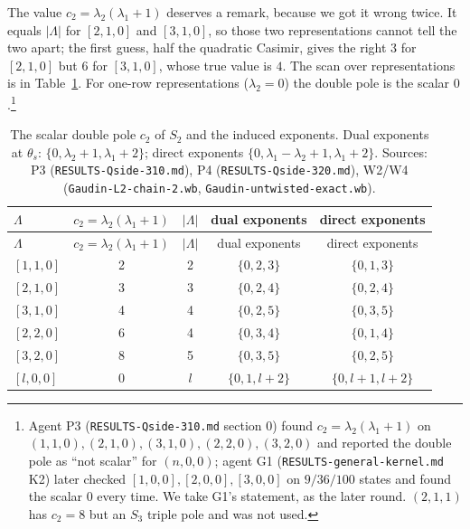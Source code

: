 \documentclass[11pt]{article}
\begin{document}
The value $c_2=\lambda_2(\lambda_1+1)$ deserves a remark, because we got it wrong twice.
It equals $|\Lambda|$ for $[2,1,0]$ and $[3,1,0]$, so those two representations cannot tell the two apart; the first guess, half the quadratic Casimir, gives the right $3$ for $[2,1,0]$ but $6$ for $[3,1,0]$, whose true value is $4$. The scan over representations is in Table~\ref{tab:c2}.
For one-row representations ($\lambda_2=0$) the double pole is the scalar $0$.\footnote{Agent P3 (\texttt{RESULTS-\allowbreak{}Qside-\allowbreak{}310.\allowbreak{}md} section 0) found $c_2=\lambda_2(\lambda_1+1)$ on $(1,1,0),(2,1,0),(3,1,0),(2,2,0),(3,2,0)$ and reported the double pole as ``not scalar'' for $(n,0,0)$; agent G1 (\texttt{RESULTS-\allowbreak{}general-\allowbreak{}kernel.\allowbreak{}md} K2) later checked $[1,0,0],[2,0,0],[3,0,0]$ on $9/36/100$ states and found the scalar $0$ every time.
We take G1's statement, as the later round. $(2,1,1)$ has $c_2=8$ but an $S_3$ triple pole and was not used.}

{\small
\begin{longtable}{lcccc}
\caption{The scalar double pole $c_2$ of $S_2$ and the induced exponents.
Dual exponents at $\theta_s$: $\{0,\lambda_2+1,\lambda_1+2\}$; direct exponents $\{0,\lambda_1-\lambda_2+1,\lambda_1+2\}$. Sources: P3 (\texttt{RESULTS-\allowbreak{}Qside-\allowbreak{}310.\allowbreak{}md}), P4 (\texttt{RESULTS-\allowbreak{}Qside-\allowbreak{}320.\allowbreak{}md}), W2/W4 (\texttt{Gaudin-\allowbreak{}L2-\allowbreak{}chain-\allowbreak{}2.\allowbreak{}wb}, \texttt{Gaudin-\allowbreak{}untwisted-\allowbreak{}exact.\allowbreak{}wb}).}\label{tab:c2}\\
\toprule
$\Lambda$ & $c_2=\lambda_2(\lambda_1+1)$ & $|\Lambda|$ & dual exponents & direct exponents \\
\midrule
\endfirsthead
\toprule
$\Lambda$ & $c_2=\lambda_2(\lambda_1+1)$ & $|\Lambda|$ & dual exponents & direct exponents \\
\midrule
\endhead
\bottomrule
\endlastfoot
$[1,1,0]$ & 2 & 2 & $\{0,2,3\}$ & $\{0,1,3\}$ \\
$[2,1,0]$ & 3 & 3 & $\{0,2,4\}$ & $\{0,2,4\}$ \\
$[3,1,0]$ & 4 & 4 & $\{0,2,5\}$ & $\{0,3,5\}$ \\
$[2,2,0]$ & 6 & 4 & $\{0,3,4\}$ & $\{0,1,4\}$ \\
$[3,2,0]$ & 8 & 5 & $\{0,3,5\}$ & $\{0,2,5\}$ \\
$[l,0,0]$ & 0 & $l$ & $\{0,1,l+2\}$ & $\{0,l+1,l+2\}$ \\
\end{longtable}}
\end{document}

